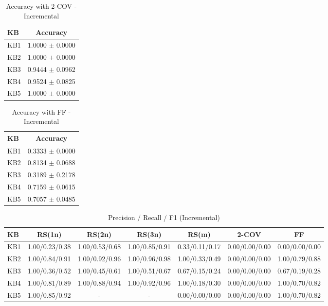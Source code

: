 \begin{table}[htbp]
\centering
\caption{Accuracy with 2-COV - Incremental}
\label{tab:table10_incremental}
\begin{tabular}{lc}
\toprule
KB & Accuracy \\
\midrule
KB1 & 1.0000 $\pm$ 0.0000 \\
KB2 & 1.0000 $\pm$ 0.0000 \\
KB3 & 0.9444 $\pm$ 0.0962 \\
KB4 & 0.9524 $\pm$ 0.0825 \\
KB5 & 1.0000 $\pm$ 0.0000 \\
\bottomrule
\end{tabular}
\end{table}

\begin{table}[htbp]
\centering
\caption{Accuracy with FF - Incremental}
\label{tab:table11_incremental}
\begin{tabular}{lc}
\toprule
KB & Accuracy \\
\midrule
KB1 & 0.3333 $\pm$ 0.0000 \\
KB2 & 0.8134 $\pm$ 0.0688 \\
KB3 & 0.3189 $\pm$ 0.2178 \\
KB4 & 0.7159 $\pm$ 0.0615 \\
KB5 & 0.7057 $\pm$ 0.0485 \\
\bottomrule
\end{tabular}
\end{table}

\begin{table}[htbp]
\centering
\caption{Precision / Recall / F1 (Incremental)}
\label{tab:fold_metrics_incremental}
\begin{tabular}{lcccccc}
\toprule
KB & RS(1n) & RS(2n) & RS(3n) & RS(m) & 2-COV & FF \\
\midrule
KB1 & 1.00/0.23/0.38 & 1.00/0.53/0.68 & 1.00/0.85/0.91 & 0.33/0.11/0.17 & 0.00/0.00/0.00 & 0.00/0.00/0.00 \\
KB2 & 1.00/0.84/0.91 & 1.00/0.92/0.96 & 1.00/0.96/0.98 & 1.00/0.33/0.49 & 0.00/0.00/0.00 & 1.00/0.79/0.88 \\
KB3 & 1.00/0.36/0.52 & 1.00/0.45/0.61 & 1.00/0.51/0.67 & 0.67/0.15/0.24 & 0.00/0.00/0.00 & 0.67/0.19/0.28 \\
KB4 & 1.00/0.81/0.89 & 1.00/0.88/0.94 & 1.00/0.92/0.96 & 1.00/0.18/0.30 & 0.00/0.00/0.00 & 1.00/0.70/0.82 \\
KB5 & 1.00/0.85/0.92 & - & - & 0.00/0.00/0.00 & 0.00/0.00/0.00 & 1.00/0.70/0.82 \\
\bottomrule
\end{tabular}
\end{table}

